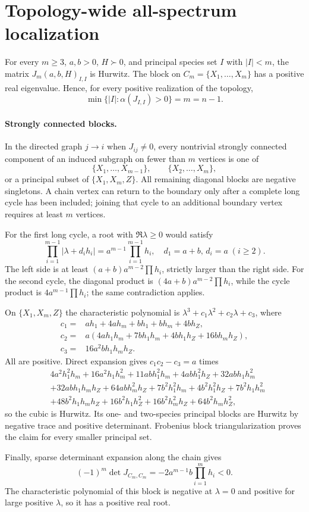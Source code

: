 \section*{Topology-wide all-spectrum localization}
\begin{theorem}
For every $m\geq3$, $a,b>0$, $H\succ0$, and principal species set $I$ with
$|I|<m$, the matrix $J_m(a,b,H)_{I,I}$ is Hurwitz.  The block on
$C_m=\{X_1,\ldots,X_m\}$ has a positive real eigenvalue.  Hence, for every
positive realization of the topology,
\[
\min\{|I|:\alpha(J_{I,I})>0\}=m=n-1.
\]
\end{theorem}

\paragraph{Strongly connected blocks.}
In the directed graph $j\to i$ when $J_{ij}\neq0$, every nontrivial strongly
connected component of an induced subgraph on fewer than $m$ vertices is one
of
\[
\{X_1,\ldots,X_{m-1}\},\qquad
\{X_2,\ldots,X_m\},
\]
or a principal subset of $\{X_1,X_m,Z\}$.  All remaining diagonal blocks are
negative singletons.  A chain vertex can return to the boundary only after a
complete long cycle has been included; joining that cycle to an additional
boundary vertex requires at least $m$ vertices.

For the first long cycle, a root with $\Re\lambda\geq0$ would satisfy
\[
\prod_{i=1}^{m-1}|\lambda+d_i h_i|
 =a^{m-1}\prod_{i=1}^{m-1}h_i,
\quad d_1=a+b,\,d_i=a\;(i\ge2).
\]
The left side is at least $(a+b)a^{m-2}\prod h_i$, strictly larger than the
right side.  For the second cycle, the diagonal product is
$(4a+b)a^{m-2}\prod h_i$, while the cycle product is
$4a^{m-1}\prod h_i$; the same contradiction applies.

On $\{X_1,X_m,Z\}$ the characteristic polynomial is
$\lambda^3+c_1\lambda^2+c_2\lambda+c_3$, where
\begin{align*}
c_1={}&ah_1+4ah_m+bh_1+bh_m+4bh_Z,\\
c_2={}&a(4ah_1h_m+7bh_1h_m+4bh_1h_Z+16bh_mh_Z),\\
c_3={}&16a^2bh_1h_mh_Z.
\end{align*}
All are positive.  Direct expansion gives $c_1c_2-c_3=a$ times
\begin{align*}
&4a^2h_1^2h_m+16a^2h_1h_m^2+11abh_1^2h_m+4abh_1^2h_Z
+32abh_1h_m^2\\
&+32abh_1h_mh_Z+64abh_m^2h_Z+7b^2h_1^2h_m+4b^2h_1^2h_Z
+7b^2h_1h_m^2\\
&+48b^2h_1h_mh_Z+16b^2h_1h_Z^2+16b^2h_m^2h_Z
+64b^2h_mh_Z^2,
\end{align*}
so the cubic is Hurwitz.  Its one- and two-species principal blocks are
Hurwitz by negative trace and positive determinant.  Frobenius block
triangularization proves the claim for every smaller principal set.

Finally, sparse determinant expansion along the chain gives
\[
(-1)^m\det J_{C_m,C_m}
=-2a^{m-1}b\prod_{i=1}^m h_i<0.
\]
The characteristic polynomial of this block is negative at $\lambda=0$ and
positive for large positive $\lambda$, so it has a positive real root.
